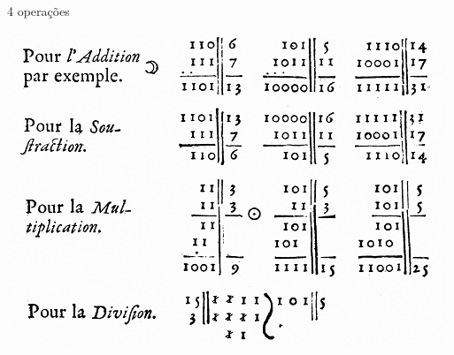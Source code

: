 \vfill
\pagebreak
{\LARGE 4 operações}
\begin{center}
	\includegraphics[height=.9\textheight]{./IMG/leibnizbinario.png}
\end{center}

\vfill
\pagebreak